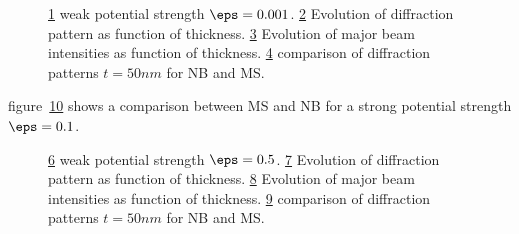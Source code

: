 \documentclass[a4paper,10pt]{article}
\begin{document}
\begin{figure}[h!]
	\begin{subfigure}{0.24\textwidth}
		\centering
    \def\svgwidth{\columnwidth}
		
		\caption{}\label{fig:MSvsNBweak_V}
	\end{subfigure}
	\begin{subfigure}{0.24\textwidth}
		\centering
    \def\svgwidth{\columnwidth}
		
		\caption{}\label{fig:MSvsNBweak_Iz}
	\end{subfigure}
  \begin{subfigure}{0.24\textwidth}
		\centering
    \def\svgwidth{\columnwidth}
		
		\caption{}\label{fig:MSvsNBweak_Bz}
	\end{subfigure}
	\begin{subfigure}{0.24\textwidth}
		\centering
    \def\svgwidth{\columnwidth}
		
		\caption{}\label{fig:MSvsNBweak_I}
	\end{subfigure}

	\caption[MS vs NB weak]{
		\ref{fig:MSvsNBweak_V} weak potential strength $\eps=0.001$.
		\ref{fig:MSvsNBweak_Iz} Evolution of diffraction pattern as function of thickness.
		\ref{fig:MSvsNBweak_Bz} Evolution of major beam intensities as function of thickness.
		\ref{fig:MSvsNBweak_I} comparison of diffraction patterns $t=50nm$ for NB and MS.
	}\label{fig:MSvsNBweak}
\end{figure}

figure~\ref{fig:MSvsNBstrong} shows a comparison between MS and NB for a strong potential strength $\eps=0.1$.


\begin{figure}[h!]
	\begin{subfigure}{0.24\textwidth}
		\centering
    \def\svgwidth{\columnwidth}
		
		\caption{}\label{fig:MSvsNBstrong_V}
	\end{subfigure}
	\begin{subfigure}{0.24\textwidth}
		\centering
    \def\svgwidth{\columnwidth}
		
		\caption{}\label{fig:MSvsNBstrong_Iz}
	\end{subfigure}
  \begin{subfigure}{0.24\textwidth}
		\centering
    \def\svgwidth{\columnwidth}
		
		\caption{}\label{fig:MSvsNBstrong_Bz}
	\end{subfigure}
	\begin{subfigure}{0.24\textwidth}
		\centering
    \def\svgwidth{\columnwidth}
		
		\caption{}\label{fig:MSvsNBstrong_I}
	\end{subfigure}

	\caption[MS vs NB strong]{
		\ref{fig:MSvsNBstrong_V} weak potential strength $\eps=0.5$.
		\ref{fig:MSvsNBstrong_Iz} Evolution of diffraction pattern as function of thickness.
		\ref{fig:MSvsNBstrong_Bz} Evolution of major beam intensities as function of thickness.
		\ref{fig:MSvsNBstrong_I} comparison of diffraction patterns $t=50nm$ for NB and MS.
	}\label{fig:MSvsNBstrong}
\end{figure}
\end{document}
